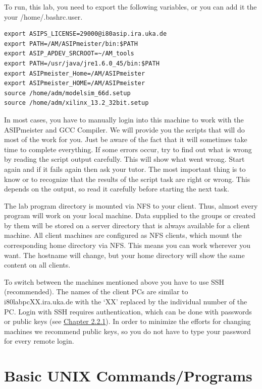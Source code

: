 To run, this lab, you need to export the following variables, or you can
add it the your /home/.bashrc.user.
\begin{lstlisting}
export ASIPS_LICENSE=29000@i80asip.ira.uka.de
export PATH=/AM/ASIPmeister/bin:$PATH
export ASIP_APDEV_SRCROOT=~/AM_tools
export PATH=/usr/java/jre1.6.0_45/bin:$PATH
export ASIPmeister_Home=/AM/ASIPmeister
export ASIPmeister_HOME=/AM/ASIPmeister
source /home/adm/modelsim_66d.setup
source /home/adm/xilinx_13.2_32bit.setup
\end{lstlisting}
In most cases, you have to manually login into this machine to work with
the ASIPmeister and GCC Compiler. We will provide you the scripts that
will do most of the work for you. Just be aware of the fact that it will
sometimes take time to complete everything. If some errors occur, try to
find out what is wrong by reading the script output carefully. This will
show what went wrong. Start again and if it fails again then ask your
tutor. The most important thing is to know or to recognize that the
results of the script task are right or wrong. This depends on the
output, so read it carefully before starting the next task.

The lab program directory is mounted via NFS to your client. Thus,
almost every program will work on your local machine. Data supplied to
the groups or created by them will be stored on a server directory that
is always available for a client machine. All client machines are
configured as NFS clients, which mount the corresponding home directory
via NFS. This means you can work wherever you want. The hostname will
change, but your home directory will show the same content on all
clients.

To switch between the machines mentioned above you have to use SSH
(recommended). The names of the client PCs are similar to
i80labpcXX.ira.uka.de with the `XX' replaced by the individual number of
the PC. Login with SSH requires authentication, which can be done with
passwords or public keys (see
\protect\hyperlink{remote-operation}{Chapter 2.2.1}). In order to
minimize the efforts for changing machines we recommend public keys, so
you do not have to type your password for every remote login.

\hypertarget{basic-unix-commandsprograms}{%
\section{Basic UNIX
Commands/Programs}\label{basic-unix-commandsprograms}}


